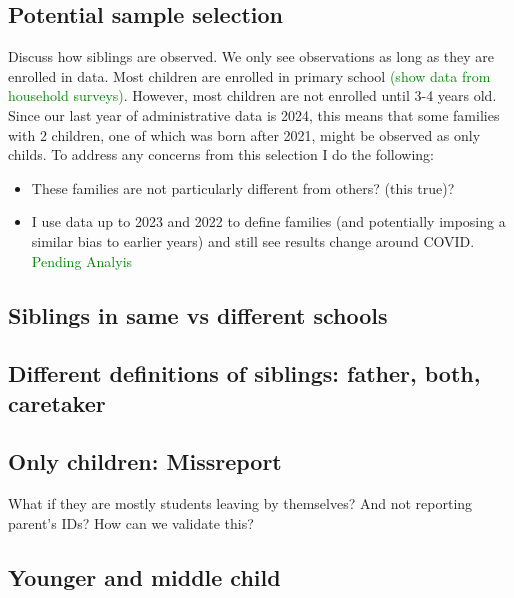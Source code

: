 
\subsection{Potential sample selection}

Discuss how siblings are observed. We only see observations as long as they are enrolled in data. Most children are enrolled in primary school \textcolor{green}{(show data from household surveys)}. However, most children are not enrolled until 3-4 years old. Since our last year of administrative data is 2024, this means that some families with 2 children, one of which was born after 2021, might be observed as only childs. To address any concerns from this selection I do the following:

\begin{itemize}
    \item These families are not particularly different from others? (this true)?
    \item I use data up to 2023 and 2022 to define families (and potentially imposing a similar bias to earlier years) and still see results change around COVID. \textcolor{green}{Pending Analyis}
\end{itemize}


\subsection{Siblings in same vs different schools}

\subsection{Different definitions of siblings: father, both, caretaker}

\subsection{Only children: Missreport}

What if they are mostly students leaving by themselves? And not reporting parent's IDs? How can we validate this?

\subsection{Younger and middle child}

